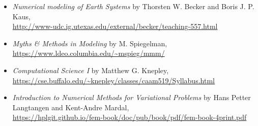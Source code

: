 \begin{itemize}
\item {\it Numerical modeling of Earth Systems} by Thorsten W. Becker and Boris J. P. Kaus,\\ 
\url{http://www-udc.ig.utexas.edu/external/becker/teaching-557.html}

\item {\it Myths \& Methods in Modeling} by M. Spiegelman,\\
 \url{https://www.ldeo.columbia.edu/~mspieg/mmm/}

\item {\it Computational Science I} by Matthew G. Knepley,\\
 \url{https://cse.buffalo.edu/~knepley/classes/caam519/Syllabus.html}

\item {\it Introduction to Numerical Methods for Variational Problems} by Hans Petter Langtangen and 
Kent-Andre Mardal, \\
\url{https://hplgit.github.io/fem-book/doc/pub/book/pdf/fem-book-4print.pdf}
\end{itemize}
